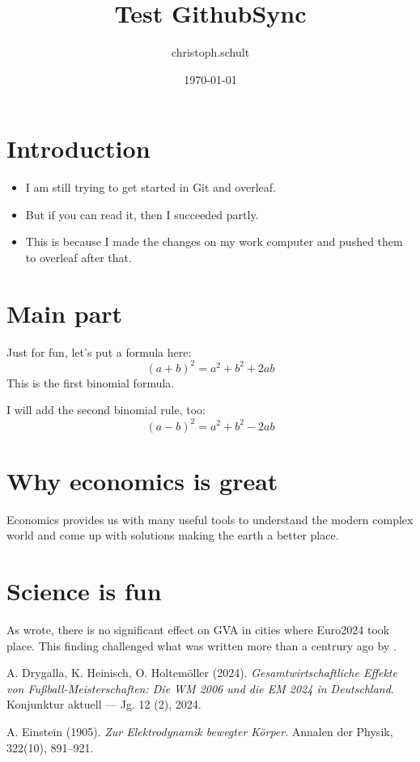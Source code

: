 \documentclass{article}
\title{Test GithubSync}
\author{christoph.schult }
\date{\today}
\begin{document}
\maketitle

\section{Introduction}

\begin{itemize} 
    \item I am still trying to get started in Git and overleaf.
    \item But if you can read it, then I succeeded partly.
    \item This is because I made the changes on my work computer and pushed them to overleaf after that.
\end{itemize}

\section{Main part}
Just for fun, let's put a formula here: 
$$ (a + b)^2 = a^2 + b^2 + 2ab $$
This is the first binomial formula. 

I will add the second binomial rule, too:
$$ (a - b)^2 = a^2 + b^2 - 2ab $$

\section{Why economics is great}
Economics provides us with many useful tools to understand the modern 
complex world and come up with solutions making the earth a better place.



\section{Science is fun}
As \cite{holtem2024a} wrote, there is no significant effect on GVA in cities where Euro2024 took place. This finding challenged what was written more than a centrury ago by \cite{einstein1905}.

\begin{thebibliography}{9}

  A. Drygalla, K. Heinisch, O. Holtemöller (2024). 
  \textit{Gesamtwirtschaftliche Effekte von Fußball-Meisterschaften: Die WM 2006 und die EM 2024 in Deutschland}. 
  Konjunktur aktuell — Jg. 12 (2), 2024.


 A. Einstein (1905). 
 \textit{Zur Elektrodynamik bewegter Körper}. 
 Annalen der Physik, 322(10), 891--921.

\end{thebibliography}
\end{document}

